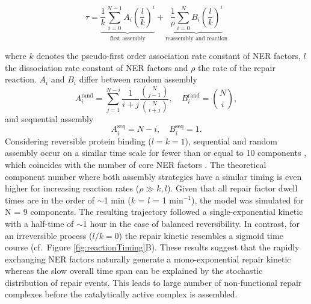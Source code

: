 \begin{equation}
\tau = \underbrace{\frac{1}{k}\sum^{N-1}_{i=0}A_i\left(\frac{l}{k}\right)^i}_{\text{first assembly}} +  \underbrace{\frac{1}{\rho}\sum_{i=0}^{N}B_i \left(\frac{l}{k}\right)^i}_{\text{reassembly and reaction}} \label{Eqn:taugen}
\end{equation}

where $k$ denotes the pseudo-first order association rate constant of NER factors, $l$ the dissociation rate constant of NER factors and $\rho$ the rate of the repair reaction. $A_i$ and $B_i$ differ between random assembly
\begin{equation}
A_i^\text{rand}= \sum_{j=1}^{N-i}\frac{1}{i+j}\frac{{N \choose j-1}}{{N\choose i+j}} , \quad B_i^\text{rand} = {N\choose i},\label{Eqn:coefrand}
\end{equation} 
and sequential assembly           
\begin{equation}
A_i^\text{seq}= N-i , \quad B_i^\text{seq} = 1.\label{Eqn.coefseq}
\end{equation}
Considering reversible protein binding ($l=k=1$), sequential and random assembly occur on a similar time scale for fewer than or equal to 10 components \cite{Terstiege2010}, which coincides with the number of core NER factors \cite{Luijsterburg2010}. The theoretical component number where both assembly strategies have a similar timing is even higher for increasing reaction rates ($\rho \gg k,l$). Given that all repair factor dwell times are in the order of $\sim$1 min ($k$ = $l$ = 1 $\text{min}^{-\text{1}}$), the model was simulated for N = 9 components. The resulting trajectory followed a single-exponential kinetic with a half-time of $\sim$1 hour in the case of balanced reversibility. In contrast, for an irreversible process ($l/k = 0$) the repair kinetic resembles a sigmoid time course (cf.\ Figure \ref{fig:reactionTiming}B). These results suggest that the rapidly exchanging NER factors naturally generate a mono-exponential repair kinetic whereas the slow overall time span can be explained by the stochastic distribution of repair events. This leads to large number of non-functional repair complexes before the catalytically active complex is assembled.  


